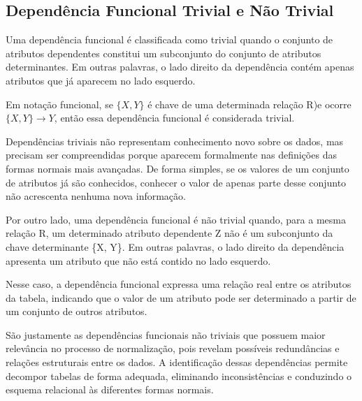 \subsection{Dependência Funcional Trivial e Não Trivial}
Uma dependência funcional é classificada como trivial quando o conjunto de atributos dependentes constitui um subconjunto do conjunto de atributos determinantes. Em outras palavras, o lado direito da dependência contém apenas atributos que já aparecem no lado esquerdo.\cite{date2003introducao}

Em notação funcional, se $\{X, Y\}$ é chave de uma determinada relação R)e ocorre $\{X, Y\} \rightarrow Y$, então essa dependência funcional é considerada trivial.

Dependências triviais não representam conhecimento novo sobre os dados, mas precisam ser compreendidas porque aparecem formalmente nas definições das formas normais mais avançadas. De forma simples, se os valores de um conjunto de atributos já são conhecidos, conhecer o valor de apenas parte desse conjunto não acrescenta nenhuma nova informação.

Por outro lado, uma dependência funcional é não trivial quando, para a mesma relação R, um determinado atributo dependente Z não é um subconjunto da chave determinante \{X, Y\}. Em outras palavras, o lado direito da dependência apresenta um atributo que não está contido no lado esquerdo.

Nesse caso, a dependência funcional expressa uma relação real entre os atributos da tabela, indicando que o valor de um atributo pode ser determinado a partir de um conjunto de outros atributos.

São justamente as dependências funcionais não triviais que possuem maior relevância no processo de normalização, pois revelam possíveis redundâncias e relações estruturais entre os dados. A identificação dessas dependências permite decompor tabelas de forma adequada, eliminando inconsistências e conduzindo o esquema relacional às diferentes formas normais.

